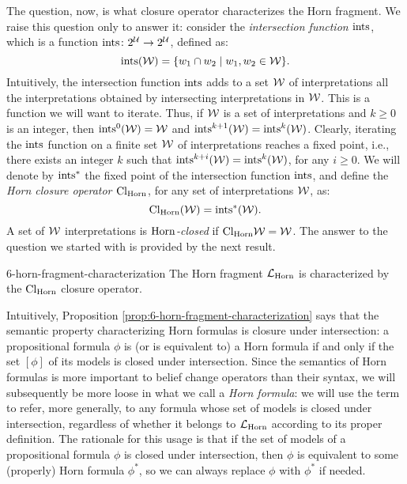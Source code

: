 The question, now, is what closure operator characterizes the Horn fragment.
We raise this question only to answer it: consider the 
\emph{intersection function $\operatorname{ints}$},
which is a function $\operatorname{ints}\colon 2^{\mathcal{U}}\rightarrow 2^{\mathcal{U}}$, defined as:
$$
	\operatorname{ints}(\mathcal{W}) = \{w_1\cap w_2 \mid w_1,w_2\in \mathcal{W}\}.
$$
Intuitively, the intersection function $\operatorname{ints}$
adds to a set $\mathcal{W}$ of interpretations all the interpretations
obtained by intersecting interpretations in $\mathcal{W}$.
This is a function we will want to iterate.
Thus, if $\mathcal{W}$ is a set of interpretations and $k\geq 0$ is an integer,
then $\operatorname{ints}^{0}(\mathcal{W})=\mathcal{W}$ and $\operatorname{ints}^{k+1}(\mathcal{W})=\operatorname{ints}^{k}(\mathcal{W})$.
Clearly, iterating the $\operatorname{ints}$ function on a finite set $\mathcal{W}$ of interpretations
reaches a fixed point, 
i.e., there exists an integer $k$ such that $\operatorname{ints}^{k+i}(\mathcal{W})=\operatorname{ints}^{k}(\mathcal{W})$,
for any $i\geq 0$.
We will denote by $\operatorname{ints}^{\ast}$ the fixed point of the intersection function $\operatorname{ints}$,
and define the \emph{Horn closure operator ${\operatorname{Cl}}_{\mathrm{Horn}}$}, 
for any set of interpretations $\mathcal{W}$, as:
$$
	{\operatorname{Cl}}_{\mathrm{Horn}}(\mathcal{W}) = \operatorname{ints}^{\ast}(\mathcal{W}).
$$
A set of $\mathcal{W}$ interpretations is \emph{$\mathrm{Horn}$-closed} if ${\operatorname{Cl}}_{\mathrm{Horn}}{\mathcal{W}}=\mathcal{W}$.
The answer to the question we started with is provided by the next result.

\begin{prp}{\cite{McKinsey43,Horn51}}{6-horn-fragment-characterization}
	The Horn fragment $\mathcal{L}_{\mathrm{Horn}}$ is characterized by the ${\operatorname{Cl}}_{\mathrm{Horn}}$ closure
	operator.
\end{prp}

Intuitively, Proposition \ref{prop:6-horn-fragment-characterization}
says that the semantic property characterizing Horn formulas
is closure under intersection: a propositional formula $\phi$
is (or is equivalent to) a Horn formula if and only if the set
$[\phi]$ of its models is closed 
under intersection.
Since the semantics of Horn formulas is more important to belief change 
operators than their syntax,
we will subsequently be more loose in what we call a \emph{Horn formula}:
we will use the term to refer, more generally, to any formula
whose set of models is closed under intersection, regardless of 
whether it belongs to $\mathcal{L}_{\mathrm{Horn}}$ according to its proper definition. 
The rationale for this usage is that if the set of models of a propositional
formula $\phi$ is closed under intersection, 
then $\phi$ is equivalent to some (properly) Horn formula $\phi^{\ast}$, 
so we can always replace $\phi$ with $\phi^{\ast}$ if needed.

